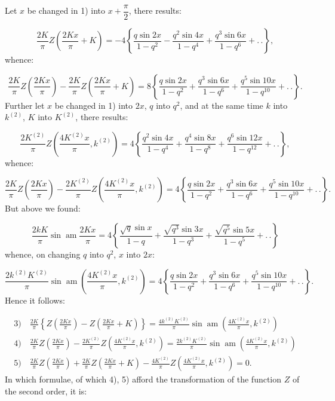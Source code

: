 \documentclass{article}
\begin{document}
Let $x$ be changed in 1) into $x+\dfrac{\pi}{2}$, there results:

\[
\frac{2K}{\pi}Z\left(\frac{2Kx}{\pi}+K\right)=-4\left\{\frac{q\sin2x}{1-q^{2}}-\frac{q^{2}\sin4x}{1-q^{4}}+\frac{q^{3}\sin6x}{1-q^{6}}+.\,.\right\},
\]
whence:

\[
\frac{2K}{\pi}Z\left(\frac{2Kx}{\pi}\right)-\frac{2K}{\pi}Z\left(\frac{2Kx}{\pi}+K\right)=8\left\{\frac{q\sin2x}{1-q^{2}}+\frac{q^{3}\sin6x}{1-q^{6}}+\frac{q^{5}\sin10x}{1-q^{10}}+.\,.\right\}.
\]
Further let $x$ be changed in 1) into $2x$, $q$ into $q^{2}$, and at the same time $k$ into $k^{(2)}$, $K$ into $K^{(2)}$, there results:

\[
\frac{2K^{(2)}}{\pi}Z\left(\frac{4K^{(2)}x}{\pi},k^{(2)}\right)=4\left\{\frac{q^{2}\sin4x}{1-q^{4}}+\frac{q^{4}\sin8x}{1-q^{8}}+\frac{q^{6}\sin12x}{1-q^{12}}+.\,.\right\},
\]
whence:

\[
\frac{2K}{\pi}Z\left(\frac{2Kx}{\pi}\right)-\frac{2K^{(2)}}{\pi}Z\left(\frac{4K^{(2)}x}{\pi},k^{(2)}\right)=4\left\{\frac{q\sin2x}{1-q^{2}}+\frac{q^{3}\sin6x}{1-q^{6}}+\frac{q^{5}\sin10x}{1-q^{10}}+.\,.\right\}.
\]
But above we found:

\[
\frac{2kK}{\pi}\sin\operatorname{am}\frac{2Kx}{\pi}=4\left\{\frac{\sqrt{q}\sin x}{1-q}+\frac{\sqrt{q^{3}}\sin3x}{1-q^{3}}+\frac{\sqrt{q^{5}}\sin5x}{1-q^{5}}+.\,.\right\}
\]
whence, on changing $q$ into $q^{2}$, $x$ into $2x$:

\[
\frac{2k^{(2)}K^{(2)}}{\pi}\sin\operatorname{am}\left(\frac{4K^{(2)}x}{\pi},k^{(2)}\right)=4\left\{\frac{q\sin2x}{1-q^{2}}+\frac{q^{3}\sin6x}{1-q^{6}}+\frac{q^{5}\sin10x}{1-q^{10}}+.\,.\right\}.
\]
Hence it follows:

\[
\begin{gathered}
\text{3)}\quad\frac{2K}{\pi}\left\{Z\left(\frac{2Kx}{\pi}\right)-Z\left(\frac{2Kx}{\pi}+K\right)\right\}=\frac{4k^{(2)}K^{(2)}}{\pi}\sin\operatorname{am}\left(\frac{4K^{(2)}x}{\pi},k^{(2)}\right)\\[1.5ex]
\text{4)}\quad\frac{2K}{\pi}Z\left(\frac{2Kx}{\pi}\right)-\frac{2K^{(2)}}{\pi}Z\left(\frac{4K^{(2)}x}{\pi},k^{(2)}\right)=\frac{2k^{(2)}K^{(2)}}{\pi}\sin\operatorname{am}\left(\frac{4K^{(2)}x}{\pi},k^{(2)}\right)\\[1.5ex]
\text{5)}\quad\frac{2K}{\pi}Z\left(\frac{2Kx}{\pi}\right)+\frac{2K}{\pi}Z\left(\frac{2Kx}{\pi}+K\right)-\frac{4K^{(2)}}{\pi}Z\left(\frac{4K^{(2)}x}{\pi},k^{(2)}\right)=0.
\end{gathered}
\]
In which formulae, of which 4), 5) afford the transformation of the function $Z$ of the second order, it is:
\end{document}
